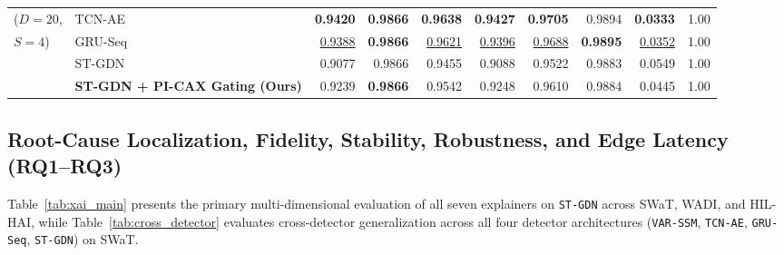 \documentclass[10pt,a4paper]{article}
\begin{document}
\begin{table}[ht!]
{\begin{tabular}{l l r r r r r r r r}
($D=20$, & TCN-AE \cite{abudurexiti2025cctak} & \textbf{0.9420} & \textbf{0.9866} & \textbf{0.9638} & \textbf{0.9427} & \textbf{0.9705} & 0.9894 & \textbf{0.0333} & 1.00 \\
$S=4$) & GRU-Seq \cite{tang2023grn, franco2026shats} & \underline{0.9388} & \textbf{0.9866} & \underline{0.9621} & \underline{0.9396} & \underline{0.9688} & \textbf{0.9895} & \underline{0.0352} & 1.00 \\
 & ST-GDN \cite{deng2021gdn} & 0.9077 & 0.9866 & 0.9455 & 0.9088 & 0.9522 & 0.9883 & 0.0549 & 1.00 \\
 & \textbf{ST-GDN + PI-CAX Gating (Ours)} & 0.9239 & \textbf{0.9866} & 0.9542 & 0.9248 & 0.9610 & 0.9884 & 0.0445 & 1.00 \\
\bottomrule
\end{tabular}%
}
\end{table}

\subsection{Root-Cause Localization, Fidelity, Stability, Robustness, and Edge Latency (RQ1--RQ3)}

Table~\ref{tab:xai_main} presents the primary multi-dimensional evaluation of all seven explainers on \texttt{ST-GDN} across SWaT, WADI, and HIL-HAI, while Table~\ref{tab:cross_detector} evaluates cross-detector generalization across all four detector architectures (\texttt{VAR-SSM}, \texttt{TCN-AE}, \texttt{GRU-Seq}, \texttt{ST-GDN}) on SWaT.
\end{document}
